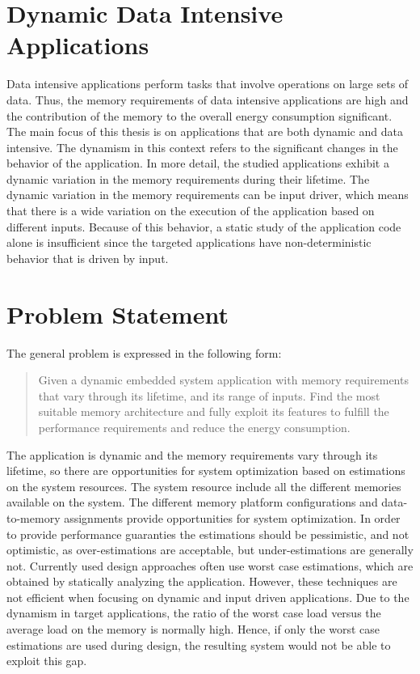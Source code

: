 \section{Dynamic Data Intensive Applications}

Data intensive applications perform tasks that involve operations on large sets of data.
Thus, the memory requirements of data intensive applications are high and the contribution of the memory to the overall energy consumption significant.
The main focus of this thesis is on applications that are both dynamic and data intensive.
The dynamism in this context refers to the significant changes in the behavior of the application.
In more detail, the studied applications exhibit a dynamic variation in the memory requirements during their lifetime.
The dynamic variation in the memory requirements can be input driver, which means that there is a wide variation on the execution of the application based on different inputs.
Because of this behavior, a static study of the application code alone is insufficient since the targeted applications have non-deterministic behavior that is driven by input.

\section{Problem Statement}
\label{sec:problem}

The general problem is expressed in the following form:
\begin{quote}
Given a dynamic embedded system application with memory requirements that vary through its lifetime, and its range of inputs. Find the most suitable memory architecture and fully exploit its features to fulfill the performance requirements and reduce the energy consumption. 
\end{quote} 

The application is dynamic and the memory requirements vary through its lifetime, so there are opportunities for system optimization based on estimations on the system resources.
The system resource include all the different memories available on the system.
The different memory platform configurations and data-to-memory assignments provide opportunities for system optimization.
In order to provide performance guaranties the estimations should be pessimistic, and not optimistic, as over-estimations are acceptable, but under-estimations are generally not.
Currently used design approaches often use worst case estimations, which are obtained by statically analyzing the application. 
However, these techniques are not efficient when focusing on dynamic and input driven applications.
Due to the dynamism in target applications, the ratio of the worst case load versus the average load on the memory is normally high.
Hence, if only the worst case estimations are used during design, the resulting system would not be able to exploit this gap. 

